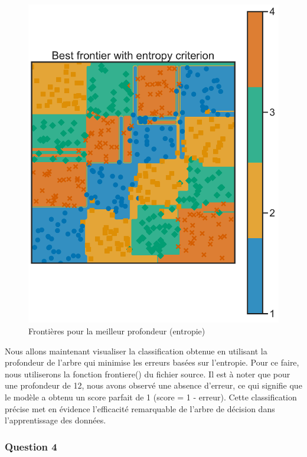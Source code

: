 \documentclass[
  letterpaper,
  DIV=11,
  numbers=noendperiod]{scrartcl}
\begin{document}
\begin{figure}[H]

{\centering \includegraphics{TP_files/figure-pdf/frontiere-output-2.pdf}

}

\caption{Frontières pour la meilleur profondeur (entropie)}

\end{figure}

Nous allons maintenant visualiser la classification obtenue en utilisant
la profondeur de l'arbre qui minimise les erreurs basées sur l'entropie.
Pour ce faire, nous utiliserons la fonction frontiere() du fichier
source. Il est à noter que pour une profondeur de 12, nous avons observé
une absence d'erreur, ce qui signifie que le modèle a obtenu un score
parfait de 1 (score = 1 - erreur). Cette classification précise met en
évidence l'efficacité remarquable de l'arbre de décision dans
l'apprentissage des données.

\hypertarget{question-4}{%
\subsubsection{\texorpdfstring{Question 4
}{Question 4 }}\label{question-4}}
\end{document}
